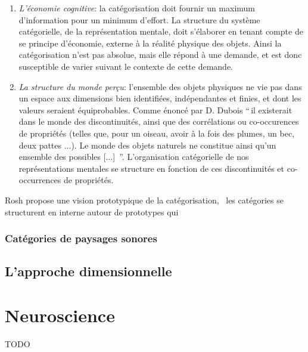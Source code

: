 \begin{enumerate}
\item \textit{L'économie cognitive}: la catégorisation doit fournir un maximum d'information pour un minimum d'effort. La structure du système catégorielle, \ie de la représentation mentale, doit s’élaborer en tenant compte de se principe d'économie, externe à la réalité physique des objets. Ainsi la catégorisation n'est pas absolue, mais elle répond à une demande, et est donc susceptible de varier suivant le contexte de cette demande.
\item \textit{La structure du monde perçu}: l'ensemble des objets physiques ne vie pas dans un espace aux dimensions bien identifiées, indépendantes et finies, et dont les valeurs seraient équiprobables. Comme énoncé par D. Dubois \citep[p. 33]{dubois1991semantique} ``\,il existerait dans le monde des discontinuités, ainsi que des corrélations ou co-occurences de propriétés (telles que, pour un oiseau, avoir à la fois des plumes, un bec, deux pattes ...). Le monde des objets naturels ne constitue ainsi qu'un ensemble des possibles [$\ldots$] \,''. L'organisation catégorielle de nos représentations mentales se structure en fonction de ces discontinuités et co-occurrences de propriétés. 
\end{enumerate}



Rosh propose une vision prototypique de la catégorisation, \ie~les catégories se structurent en interne autour de prototypes qui 

\subsubsection{Catégories de paysages sonores}

\subsection{L'approche dimensionnelle}

\section{Neuroscience}
\label{sec:Neuroscience}
TODO
